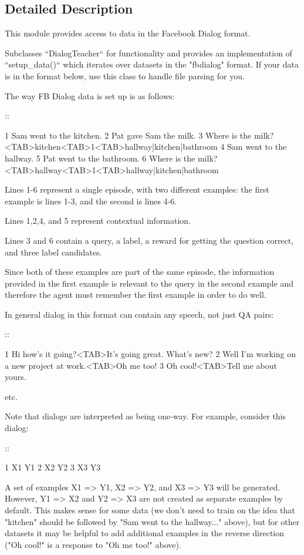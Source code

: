\subsection{Detailed Description}
\begin{DoxyVerb}This module provides access to data in the Facebook Dialog format.

Subclasses ``DialogTeacher`` for functionality and provides an
implementation of ``setup_data()`` which iterates over datasets in the
"fbdialog" format. If your data is in the format below, use this class to
handle file parsing for you.

The way FB Dialog data is set up is as follows:

::

    1 Sam went to the kitchen.
    2 Pat gave Sam the milk.
    3 Where is the milk?<TAB>kitchen<TAB>1<TAB>hallway|kitchen|bathroom
    4 Sam went to the hallway.
    5 Pat went to the bathroom.
    6 Where is the milk?<TAB>hallway<TAB>1<TAB>hallway|kitchen|bathroom

Lines 1-6 represent a single episode, with two different examples: the
first example is lines 1-3, and the second is lines 4-6.

Lines 1,2,4, and 5 represent contextual information.

Lines 3 and 6 contain a query, a label, a reward for getting the question
correct, and three label candidates.

Since both of these examples are part of the same episode, the information
provided in the first example is relevant to the query in the second
example and therefore the agent must remember the first example in order to
do well.

In general dialog in this format can contain any speech, not just QA pairs:

::

    1 Hi how's it going?<TAB>It's going great. What's new?
    2 Well I'm working on a new project at work.<TAB>Oh me too!
    3 Oh cool!<TAB>Tell me about yours.

etc.

Note that dialogs are interpreted as being one-way. For example, consider
this dialog:

::

    1 X1    Y1
    2 X2    Y2
    3 X3    Y3

A set of examples X1 => Y1, X2 => Y2, and X3 => Y3 will be generated.
However, Y1 => X2 and Y2 => X3 are not created as separate examples by
default. This makes sense for some data (we don't need to train on the idea
that "kitchen" should be followed by "Sam went to the hallway..." above),
but for other datasets it may be helpful to add additional examples in the
reverse direction ("Oh cool!" is a response to "Oh me too!" above).
\end{DoxyVerb}
 

